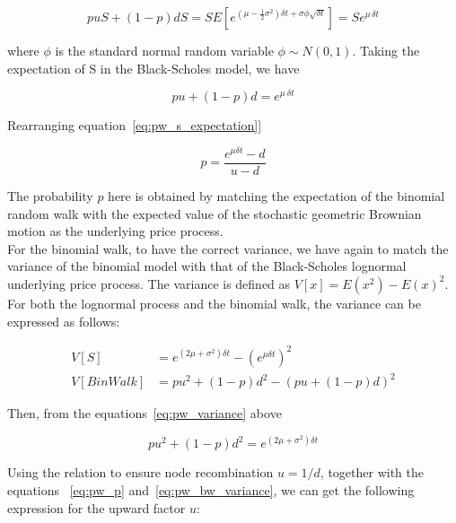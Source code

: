     \begin{equation}
        puS + (1 - p)dS =
            SE \left[ e^{\left(\mu -\frac{1}{2} \sigma^2 \right) \delta t + \sigma \phi \sqrt{\delta t}} \right] =
            S e^{\mu \, \delta t}
        \label{eq:pw_drift}
    \end{equation}

    where $\phi$ is the standard normal random variable $\phi \sim N(0,1)$.
    Taking the expectation of S in the Black-Scholes model, we have

    \begin{equation}
        pu + (1 - p)d = e^{\mu \ \delta t}
        \label{eq:pw_s_expectation]}
    \end{equation}

    Rearranging equation~\ref{eq:pw_s_expectation]}

    \begin{equation}
        p = \frac{e^{\mu \delta t} - d}{u - d}
        \label{eq:pw_p}
    \end{equation}

    The probability $p$ here is obtained by matching the expectation of the binomial random walk with the expected
    value of the stochastic geometric Brownian motion as the underlying price process. \\

    For the binomial walk, to have the correct variance, we have again to match the variance of the binomial model
    with that of the Black-Scholes lognormal underlying price process.
    The variance is defined as $V[x] = E(x^2) - E(x)^2$.
    For both the lognormal process and the binomial walk, the variance can be expressed as follows:

    \begin{align}
        V[S] &= e^{(2\mu + \sigma^2)\delta t} - \left(e^{\mu \delta t}\right)^2 \\
        V[BinWalk] &= p u^2 + (1 - p) d^2 - \left(p u + (1 - p) d\right)^2
        \label{eq:pw_variance}
    \end{align}

    Then, from the equations~\ref{eq:pw_variance} above

    \begin{equation}
        p u^2 + (1 - p) d^2 = e^{(2\mu + \sigma^2)\delta t}
        \label{eq:pw_bw_variance}
    \end{equation}

    Using the relation to ensure node recombination $u = 1/d$, together with the equations
    ~\ref{eq:pw_p} and~\ref{eq:pw_bw_variance}, we can get the following expression for the upward factor $u$:

